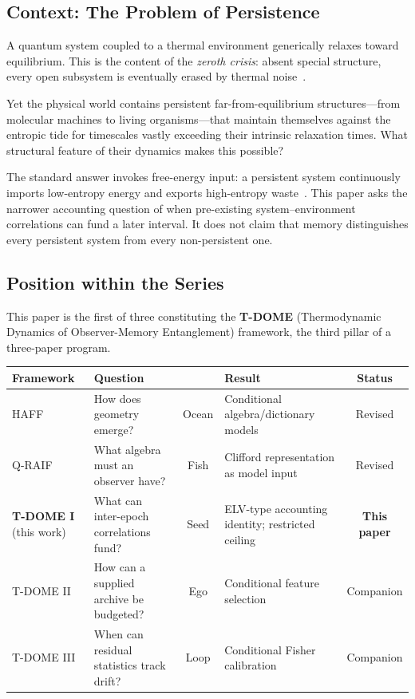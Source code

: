 \documentclass[12pt,a4paper,openany]{book}
\begin{document}
\subsection{Context: The Problem of Persistence}

A quantum system coupled to a thermal environment generically
relaxes toward equilibrium. This is the content of the
\emph{zeroth crisis}: absent special structure, every open
subsystem is eventually erased by thermal noise~\cite{BreuerPetruccione2002}.

Yet the physical world contains persistent far-from-equilibrium
structures---from molecular machines to living organisms---that
maintain themselves against the entropic tide for timescales
vastly exceeding their intrinsic relaxation times. What
structural feature of their dynamics makes this possible?

The standard answer invokes free-energy input: a persistent system
continuously imports low-entropy energy and exports high-entropy
waste~\cite{Schrodinger1944}.  This paper asks the narrower accounting
question of when pre-existing system--environment correlations can fund
a later interval.  It does not claim that memory distinguishes every
persistent system from every non-persistent one.

\subsection{Position within the Series}

This paper is the first of three constituting the
\textbf{T-DOME} (Thermodynamic Dynamics of Observer-Memory
Entanglement) framework, the third pillar of a three-paper
program.

\begin{center}
\small
\setlength{\tabcolsep}{4pt}%
\begin{tabular}{@{}lP{3.2cm}cP{3.4cm}c@{}}
\toprule
\textbf{Framework} & \textbf{Question} & & \textbf{Result} & \textbf{Status} \\
\midrule
HAFF~\cite{Liu2026HAFF_A,Liu2026HAFF_B}
  & How does geometry emerge?
  & Ocean
  & Conditional algebra/dictionary models
  & Revised \\[3pt]
Q-RAIF~\cite{Liu2026QRAIF_A,Liu2026QRAIF_B}
  & What algebra must an observer have?
  & Fish
  & Clifford representation as model input
  & Revised \\[3pt]
\textbf{T-DOME I} (this work)
  & What can inter-epoch correlations fund?
  & Seed
  & ELV-type accounting identity; restricted ceiling
  & \textbf{This paper} \\[3pt]
T-DOME II
  & How can a supplied archive be budgeted?
  & Ego
  & Conditional feature selection
  & Companion \\[3pt]
T-DOME III
  & When can residual statistics track drift?
  & Loop
  & Conditional Fisher calibration
  & Companion \\
\bottomrule
\end{tabular}
\end{center}
\end{document}
